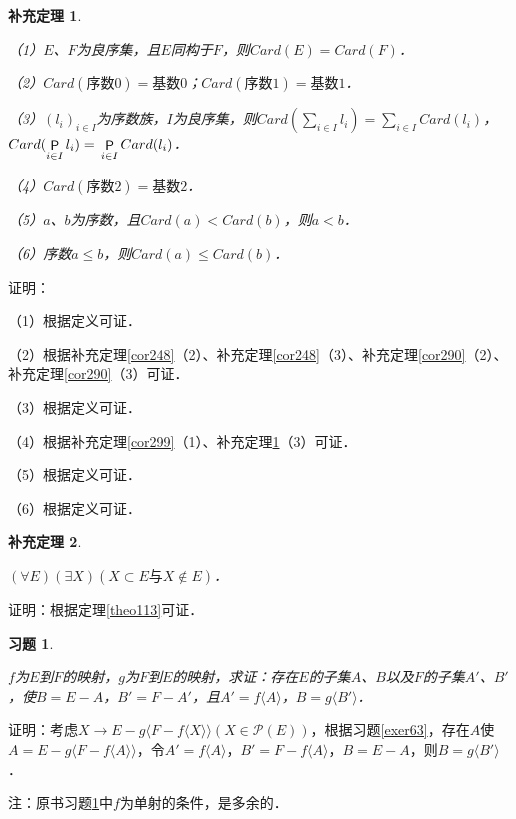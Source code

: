 \documentclass[12pt, a4paper, oneside]{book}
\newtheorem{cor}{补充定理}
\newtheorem{exer}{习题}
\begin{document}
			\begin{cor}\label{cor301}
				\hfill\par
				（1）$E$、$F$为良序集，且$E$同构于$F$，则$Card(E)=Card(F)$．
				\par
				（2）$Card(\text{序数}0)=\text{基数}0$；$Card(\text{序数}1)=\text{基数}1$．
				\par
				（3）$(l_i)_{i\in I}$为序数族，$I$为良序集，则$Card(\sum\limits_{i\in I}l_i)= \sum\limits_{i\in I}Card(l_i)$，$Card(\mathop{\mathsf{P}}\limits_{i\in I}l_i)=\\\mathop{\mathsf{P}}\limits_{i\in I}Card(l_i)$．
				\par
				（4）$Card(\text{序数}2)=\text{基数}2$．
				\par
				（5）$a$、$b$为序数，且$Card(a)<Card(b)$，则$a<b$．
				\par
				（6）序数$a\leq b$，则$Card(a)\leq Card(b)$．
			\end{cor}
			证明：
			\par			
			（1）根据定义可证．
			\par
			（2）根据补充定理\ref{cor248}（2）、补充定理\ref{cor248}（3）、补充定理\ref{cor290}（2）、补充定理\ref{cor290}（3）可证．
			\par
			（3）根据定义可证．
			\par
			（4）根据补充定理\ref{cor299}（1）、补充定理\ref{cor301}（3）可证．
			\par
			（5）根据定义可证．
			\par
			（6）根据定义可证．
			
			\begin{cor}\label{cor302}
				\hfill\par
				$(\forall E)(\exists X)(X\subset E\text{与}X \notin E)$．
			\end{cor}
			证明：根据定理\ref{theo113}可证．
			
			\begin{exer}\label{exer121}
				\hfill\par
				$f$为$E$到$F$的映射，$g$为$F$到$E$的映射，求证：存在$E$的子集$A$、$B$以及$F$的子集$A'$、$B'$，使$B=E-A$，$B'=F-A'$，且$A'=f\langle A\rangle$，$B=g\langle B'\rangle$．
			\end{exer}
			证明：考虑$X\to E-g\langle F-f\langle X\rangle\rangle(X\in \mathcal{P}(E))$，根据习题\ref{exer63}，存在$A$使$A= E-g\langle F-f\langle A\rangle\rangle$，令$A'=f\langle A\rangle$，$B'=F-f\langle A\rangle$，$B=E-A$，则$B=g\langle B'\rangle$．
			\par
			注：原书习题\ref{exer121}中$f$为单射的条件，是多余的．
			
\end{document}
